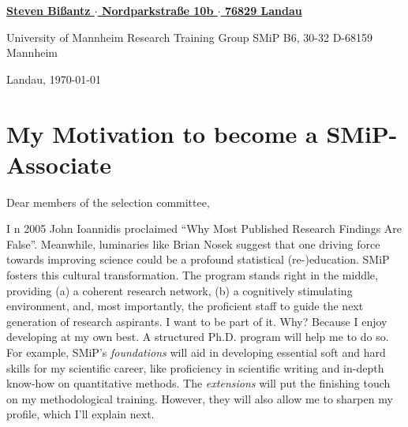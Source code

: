 \documentclass[11pt]{FreemanML}
\begin{document}
\begin{paracol}{2}

\switchcolumn %

\color{headings} 
\vspace{2cm}
\underline{\textbf{\footnotesize{Steven Bißantz $\cdot$ Nordparkstraße 10b $\cdot$ 76829 Landau}}}

\color{text}
\bigskip
\begin{leftbar}
University of Mannheim \newline
Research Training Group SMiP \newline
B6, 30-32 \newline
D-68159 Mannheim
\end{leftbar}

\switchcolumn

\vspace{5cm}
\begin{flushright}
Landau, \today
\end{flushright}
\end{paracol} %

\vspace{1cm}
\section*{My Motivation to become a SMiP-Associate}
\bigskip
Dear members of the selection committee,
\smallskip

\onehalfspacing

\lettrine[lines=3]{I}{} n 2005 John Ioannidis proclaimed \enquote{Why Most
Published Research Findings Are False}. Meanwhile, luminaries like Brian Nosek
suggest that one driving force towards improving science could be a profound
statistical (re-)education. SMiP fosters this cultural transformation. The
program stands right in the middle, providing (a) a coherent research network,
(b) a cognitively stimulating environment, and, most importantly, the
proficient staff to guide the next generation of research aspirants. I want to
be part of it. Why? Because I enjoy developing at my own best. A structured
Ph.D. program will help me to do so. For example, SMiP's \textit{foundations}
will aid in developing essential soft and hard skills for my scientific career,
like proficiency in scientific writing and in-depth know-how on quantitative
methods. The \textit{extensions} will put the finishing touch on my
methodological training. However, they will also allow me to sharpen my
profile, which I'll explain next. 
\end{document}
